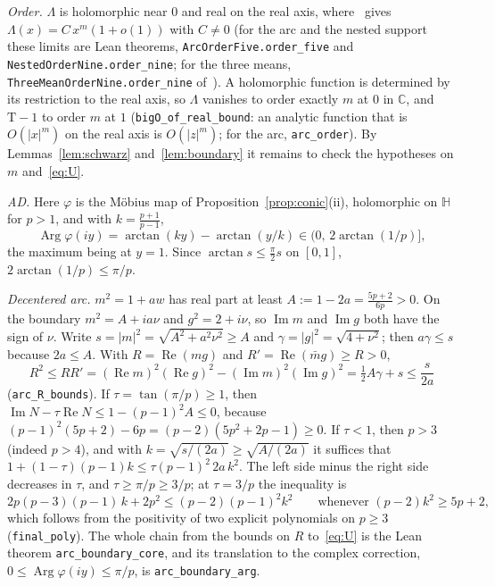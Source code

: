 \documentclass[10pt,a4paper]{article}
\theoremstyle{plain}
\theoremstyle{remark}
\numberwithin{equation}{section}
\newcommand{\C}{\mathbb{C}}\newcommand{\R}{\mathbb{R}}\newcommand{\Hp}{\mathbb{H}}
\newcommand{\Tm}{\mathrm{T}}
\DeclareMathOperator{\re}{Re}\DeclareMathOperator{\im}{Im}
\DeclareMathOperator{\Arg}{Arg}\DeclareMathOperator{\Log}{Log}
\newcommand{\lean}[1]{\texttt{#1}}
\begin{document}
\emph{Order.} $\Lambda$ is holomorphic near $0$ and real on the real axis, where~\cite{v28} gives
$\Lambda(x)=C\,x^{m}(1+o(1))$ with $C\neq0$ (for the arc and the nested support these limits are
Lean theorems, \lean{ArcOrderFive.order\_five} and \lean{NestedOrderNine.order\_nine}; for the
three means, \lean{ThreeMeanOrderNine.order\_nine} of~\cite{v29}). A
holomorphic function is determined by its restriction to the real axis, so $\Lambda$ vanishes to
order exactly $m$ at $0$ in $\C$, and $\Tm-1$ to order $m$ at $1$ (\lean{bigO\_of\_real\_bound}: an
analytic function that is $O(|x|^{m})$ on the real axis is $O(|z|^{m})$; for the arc,
\lean{arc\_order}). By Lemmas~\ref{lem:schwarz}
and~\ref{lem:boundary} it remains to check the hypotheses on $m$ and~\eqref{eq:U}.

\emph{AD.} Here $\varphi$ is the M\"obius map of Proposition~\ref{prop:conic}(ii), holomorphic on
$\Hp$ for $p>1$, and with $k=\frac{p+1}{p-1}$,
\[
 \Arg\varphi(iy)=\arctan(ky)-\arctan(y/k)\in\bigl(0,\,2\arctan(1/p)\bigr],
\]
the maximum being at $y=1$. Since $\arctan s\le\frac\pi2 s$ on $[0,1]$, $2\arctan(1/p)\le\pi/p$.

\emph{Decentered arc.} $m^{2}=1+aw$ has real part at least $A:=1-2a=\frac{5p+2}{6p}>0$. On the
boundary $m^{2}=A+ia\nu$ and $g^{2}=2+i\nu$, so $\im m$ and $\im g$ both have the sign of $\nu$.
Write $s=|m|^{2}=\sqrt{A^{2}+a^{2}\nu^{2}}\ge A$ and $\gamma=|g|^{2}=\sqrt{4+\nu^{2}}$; then
$a\gamma\le s$ because $2a\le A$. With $R=\re(mg)$ and $R'=\re(\bar mg)\ge R>0$,
\[
 R^{2}\le RR'=(\re m)^{2}(\re g)^{2}-(\im m)^{2}(\im g)^{2}=\tfrac12A\gamma+s\le\frac{s}{2a}
\]
(\lean{arc\_R\_bounds}). If $\tau=\tan(\pi/p)\ge1$, then
$\im N-\tau\re N\le1-(p-1)^{2}A\le0$, because $(p-1)^{2}(5p+2)-6p=(p-2)(5p^{2}+2p-1)\ge0$. If
$\tau<1$, then $p>3$ (indeed $p>4$), and with $k=\sqrt{s/(2a)}\ge\sqrt{A/(2a)}$ it suffices that
$1+(1-\tau)(p-1)k\le\tau(p-1)^{2}\,2a\,k^{2}$. The left side minus the right side decreases in
$\tau$, and $\tau\ge\pi/p\ge3/p$; at $\tau=3/p$ the inequality is
\[
 2p(p-3)(p-1)\,k+2p^{2}\le(p-2)(p-1)^{2}k^{2}\qquad\text{whenever }(p-2)k^{2}\ge5p+2,
\]
which follows from the positivity of two explicit polynomials on $p\ge3$ (\lean{final\_poly}). The
whole chain from the bounds on $R$ to~\eqref{eq:U} is the Lean theorem \lean{arc\_boundary\_core},
and its translation to the complex correction, $0\le\Arg\varphi(iy)\le\pi/p$, is
\lean{arc\_boundary\_arg}.
\end{document}
